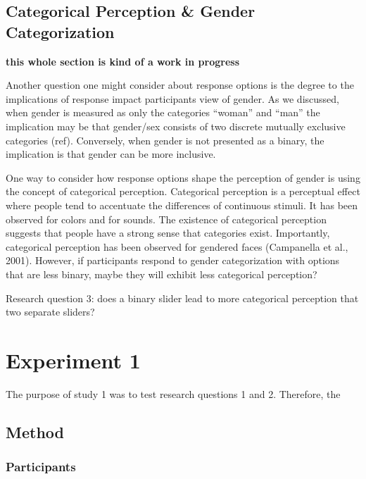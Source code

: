 \documentclass[
  man]{apa7}
\begin{document}
\hypertarget{categorical-perception-gender-categorization}{%
\subsection{Categorical Perception \& Gender Categorization}\label{categorical-perception-gender-categorization}}

\textbf{this whole section is kind of a work in progress}

Another question one might consider about response options is the degree to the implications of response impact participants view of gender. As we discussed, when gender is measured as only the categories ``woman'' and ``man'' the implication may be that gender/sex consists of two discrete mutually exclusive categories (ref). Conversely, when gender is not presented as a binary, the implication is that gender can be more inclusive.

One way to consider how response options shape the perception of gender is using the concept of categorical perception. Categorical perception is a perceptual effect where people tend to accentuate the differences of continuous stimuli. It has been observed for colors and for sounds. The existence of categorical perception suggests that people have a strong sense that categories exist. Importantly, categorical perception has been observed for gendered faces (Campanella et al., 2001). However, if participants respond to gender categorization with options that are less binary, maybe they will exhibit less categorical perception?

Research question 3: does a binary slider lead to more categorical perception that two separate sliders?

\hypertarget{experiment-1}{%
\section{Experiment 1}\label{experiment-1}}

The purpose of study 1 was to test research questions 1 and 2. Therefore, the

\hypertarget{method}{%
\subsection{Method}\label{method}}

\hypertarget{participants}{%
\subsubsection{Participants}\label{participants}}
\end{document}
